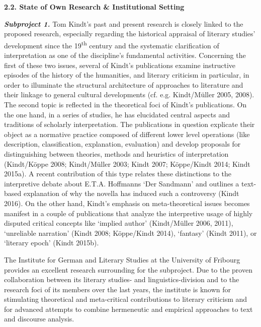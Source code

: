 
\vspace{.6cm}
\noindent\textbf{\large 2.2. State of Own Research \& Institutional Setting}
\vspace{.2cm}

\noindent \textbf{\emph{Subproject 1.}} Tom Kindt's past and present research is closely linked to the proposed research, especially regarding the historical appraisal of literary studies' development since the 19\textsuperscript{th} century and the systematic clarification of interpretation as one of the discipline's fundamental activities. Concerning the first of these two issues, several of Kindt's publications examine instructive episodes of the history of the humanities, and literary criticism in particular, in order to illuminate the structural architecture of approaches to literature and their linkage to general cultural developments (cf. e.g. Kindt/M\"uller 2005, 2008). The second topic is reflected in the theoretical foci of Kindt's publications. On the one hand, in a series of studies, he has elucidated central aspects and traditions of scholarly interpretation. The publications in question explicate their object as a normative practice composed of different lower level operations (like description, classification, explanation, evaluation) and develop proposals for distinguishing between theories, methods and heuristics of interpretation (Kindt/K\"oppe 2008; Kindt/M\"uller 2003; Kindt 2007; K\"oppe/Kindt 2014; Kindt 2015a). A recent contribution of this type relates these distinctions to the interpretive debate about E.T.A. Hoffmanns `Der Sandmann' and outlines a text-based explanation of why the novella has induced such a controversy (Kindt 2016). On the other hand, Kindt's emphasis on meta-theoretical issues becomes manifest in a couple of publications that analyze the interpretive usage of highly disputed critical concepts like `implied author' (Kindt/M\"uller 2006, 2011), `unreliable narration' (Kindt 2008; K\"oppe/Kindt 2014), `fantasy' (Kindt 2011), or `literary epoch' (Kindt 2015b). 

The Institute for German and Literary Studies at the University of Fribourg provides an excellent research surrounding for the subproject. Due to the proven collaboration between its literary studies- and linguistics-division and to the research foci of its members over the last years, the institute is known for stimulating theoretical and meta-critical contributions to literary criticism and for advanced attempts to combine hermeneutic and empirical approaches to text and discourse analysis.



